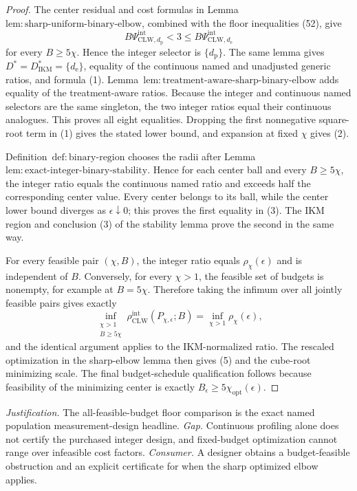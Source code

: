 \documentclass{article}
\begin{document}
\begin{proof}
The center residual and cost formulas in Lemma~\(\mathrm{lem{:}sharp\text{-}uniform\text{-}binary\text{-}elbow}\), combined with the floor inequalities (52), give
\[
 B\Psi_{\mathrm{CLW},d_{\mathrm p}}^{\mathrm{int}}<3
 \le B\Psi_{\mathrm{CLW},d_{\mathrm e}}^{\mathrm{int}}
\]
for every \(B\ge5\chi\).  Hence the integer selector is \(\{d_{\mathrm p}\}\).  The same lemma gives \(D^*=D_{\mathrm{IKM}}^*=\{d_{\mathrm e}\}\), equality of the continuous named and unadjusted generic ratios, and formula (1).  Lemma~\(\mathrm{lem{:}treatment\text{-}aware\text{-}sharp\text{-}binary\text{-}elbow}\) adds equality of the treatment-aware ratios.  Because the integer and continuous named selectors are the same singleton, the two integer ratios equal their continuous analogues.  This proves all eight equalities.  Dropping the first nonnegative square-root term in (1) gives the stated lower bound, and expansion at fixed \(\chi\) gives (2).

Definition~\(\mathrm{def{:}binary\text{-}region}\) chooses the radii after Lemma~\(\mathrm{lem{:}exact\text{-}integer\text{-}binary\text{-}stability}\).  Hence for each center ball and every \(B\ge5\chi\), the integer ratio equals the continuous named ratio and exceeds half the corresponding center value.  Every center belongs to its ball, while the center lower bound diverges as \(\epsilon\downarrow0\); this proves the first equality in (3).  The IKM region and conclusion (3) of the stability lemma prove the second in the same way.

For every feasible pair \((\chi,B)\), the integer ratio equals \(\rho_\chi(\epsilon)\) and is independent of \(B\).  Conversely, for every \(\chi>1\), the feasible set of budgets is nonempty, for example at \(B=5\chi\).  Therefore taking the infimum over all jointly feasible pairs gives exactly
\[
 \inf_{\substack{\chi>1\\B\ge5\chi}}
 \rho_{\mathrm{CLW}}^{\mathrm{int}}(P_{\chi,\epsilon};B)
 =\inf_{\chi>1}\rho_\chi(\epsilon),
\]
and the identical argument applies to the IKM-normalized ratio.  The rescaled optimization in the sharp-elbow lemma then gives (5) and the cube-root minimizing scale.  The final budget-schedule qualification follows because feasibility of the minimizing center is exactly \(B_\epsilon\ge5\chi_{\mathrm{opt}}(\epsilon)\).
\end{proof}
\par\smallskip\noindent \textit{Justification.} The all-feasible-budget floor comparison is the exact named population measurement-design headline. \textit{Gap.} Continuous profiling alone does not certify the purchased integer design, and fixed-budget optimization cannot range over infeasible cost factors. \textit{Consumer.} A designer obtains a budget-feasible obstruction and an explicit certificate for when the sharp optimized elbow applies.
\end{document}

